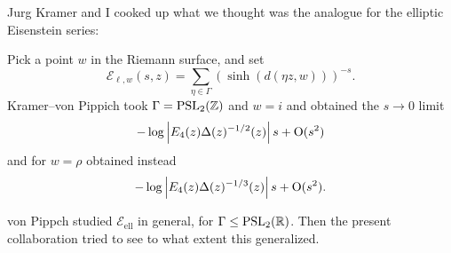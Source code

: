 \documentclass[reqno]{amsart} 
\begin{document}
Jurg Kramer and I cooked up what we thought was the analogue for the elliptic Eisenstein series:
\begin{example}
  Pick a point $w$ in the Riemann surface, and set
  \begin{equation*}
    \mathcal{E}_{\ell, w}(s, z) = \sum_{\eta \in \Gamma}
    \left( \sinh(d(\eta z, w)) \right)^{- s}.
  \end{equation*}
  Kramer--von Pippich took $\Gamma = \operatorname{PSL}_2(\mathbb{Z})$ and $w =i$ and obtained the $s \rightarrow 0$ limit
  \begin{equation*}
    - \log \left| E_4(z) \Delta(z)^{- 1/2}(z) \right| s
    + \operatorname{O}(s^2)
  \end{equation*}
  and for $w = \rho$ obtained instead
  \begin{equation*}
    - \log \left| E_4(z) \Delta(z)^{- 1/3}(z) \right| s
    + \operatorname{O}(s^2).
  \end{equation*}
\end{example}
von Pippch studied $\mathcal{E}_{\mathrm{ell}}$ in general, for $\Gamma \leq \operatorname{PSL}_2(\mathbb{R})$.  Then the present collaboration tried to see to what extent this generalized.
\end{document}
